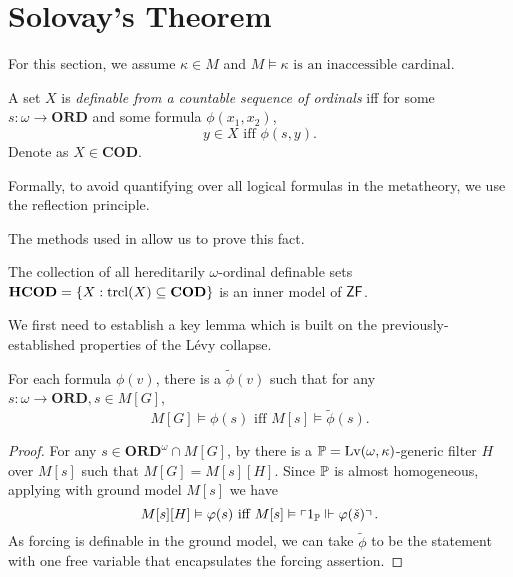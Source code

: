 \section{Solovay's Theorem}

For this section, we assume \(\kappa\in M\) and \(M\models \kappa \text{ is an inaccessible cardinal}\).

\begin{definition}
    A set \(X\) is \emph{definable from a countable sequence of ordinals} iff
    for some \(s:\omega\to\mathbf{ORD}\) and some formula \(\phi(x_1,x_2)\),
    \[ y\in X \text{ iff } \phi(s,y). \]
    Denote as \(X\in \mathbf{COD}\).
\end{definition}
\begin{remark}
    Formally, to avoid quantifying over all logical formulas in the metatheory, we use the reflection principle.
\end{remark}

The methods used in \autocite{myhillscott1971} allow us to prove this fact.
\begin{proposition}
    The collection of all hereditarily \(\omega\)-ordinal definable sets
    \(\mathbf{HCOD} = \set{X: \trcl(X) \subseteq \mathbf{COD}}\)
    is an inner model of \(\ZF\).
\end{proposition}

We first need to establish a key lemma which is built on the previously-established properties of the Lévy collapse.
\begin{lemma} \label{lemma:solovay_key}
    For each formula \(\phi(v)\), there is a \(\tilde{\phi}(v)\) such that
    for any \(s:\omega\to\mathbf{ORD}, s\in M[G]\),
    \[ M[G]\models \phi(s) \text{ iff } M[s] \models \tilde{\phi}(s). \]
\end{lemma}
\begin{proof}
    For any \(s\in \mathbf{ORD}^\omega \cap M[G]\), by 
    there is a \(\P = \Lv(\omega,\kappa)\)-generic filter \(H\) over \(M[s]\) such that \(M[G] = M[s][H]\).
    Since \(\P\) is almost homogeneous, applying  with ground model \(M[s]\) we have
    \[ M[s][H]\models \phi(s) \text{ iff } M[s] \models \left\ulcorner 1_\P \forces \phi(\check{s}) \right\urcorner. \]
    As forcing is definable in the ground model,
    we can take \(\tilde{\phi}\) to be the statement with one free variable that encapsulates the forcing assertion.
\end{proof}

